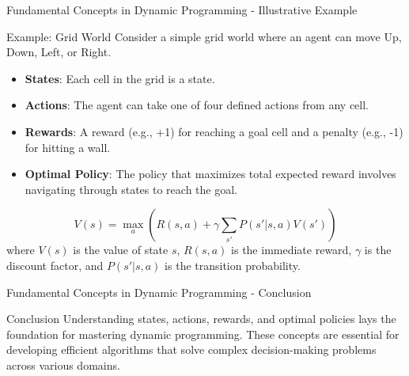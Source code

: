 \documentclass[aspectratio=169]{beamer}
\begin{document}
\begin{frame}[fragile]{Fundamental Concepts in Dynamic Programming - Illustrative Example}
    \begin{block}{Example: Grid World}
        Consider a simple grid world where an agent can move Up, Down, Left, or Right.
        \begin{itemize}
            \item \textbf{States}: Each cell in the grid is a state.
            \item \textbf{Actions}: The agent can take one of four defined actions from any cell.
            \item \textbf{Rewards}: A reward (e.g., +1) for reaching a goal cell and a penalty (e.g., -1) for hitting a wall.
            \item \textbf{Optimal Policy}: The policy that maximizes total expected reward involves navigating through states to reach the goal.
        \end{itemize}
    \end{block}

    \begin{equation}
        V(s) = \max_a \left( R(s, a) + \gamma \sum_{s'} P(s'|s, a) V(s') \right)
    \end{equation}
    where \( V(s) \) is the value of state \( s \), \( R(s, a) \) is the immediate reward, \( \gamma \) is the discount factor, and \( P(s'|s, a) \) is the transition probability.
\end{frame}

\begin{frame}[fragile]{Fundamental Concepts in Dynamic Programming - Conclusion}
    \begin{block}{Conclusion}
        Understanding states, actions, rewards, and optimal policies lays the foundation for mastering dynamic programming. 
        These concepts are essential for developing efficient algorithms that solve complex decision-making problems across various domains.
    \end{block}
\end{frame}
\end{document}
